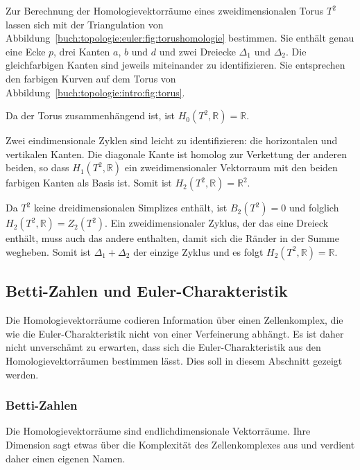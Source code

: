 \begin{beispiel}
\label{buch:topologie:euler:beispiel:torus}
Zur Berechnung der Homologievektorräume eines zweidimensionalen
Torus $T^2$ lassen sich mit der Triangulation von
Abbildung~\ref{buch:topologie:euler:fig:torushomologie} bestimmen.
Sie enthält genau eine Ecke $p$, drei Kanten $a$, $b$ und $d$ und
zwei Dreiecke $\Delta_1$ und $\Delta_2$.
Die gleichfarbigen Kanten sind jeweils miteinander zu identifizieren.
Sie entsprechen den farbigen Kurven auf dem Torus von
Abbildung~\ref{buch:topologie:intro:fig:torus}.

Da der Torus zusammenhängend ist, ist $H_0(T^2,\mathbb{R})=\mathbb{R}$.

Zwei eindimensionale Zyklen sind leicht zu identifizieren: die 
horizontalen und vertikalen Kanten.
Die diagonale Kante ist homolog zur Verkettung der anderen beiden,
so dass $H_1(T^2,\mathbb{R})$ ein zweidimensionaler Vektorraum
mit den beiden farbigen Kanten als Basis ist.
Somit ist $H_2(T^2,\mathbb{R})=\mathbb{R}^2$.

Da $T^2$ keine dreidimensionalen Simplizes enthält, ist $B_2(T^2)=0$
und folglich $H_2(T^2,\mathbb{R}) = Z_2(T^2)$.
Ein zweidimensionaler Zyklus, der das eine Dreieck enthält, muss auch
das andere enthalten, damit sich die Ränder in der Summe wegheben.
Somit ist $\Delta_1 + \Delta_2$ der einzige Zyklus und es folgt
$H_2(T^2,\mathbb{R})=\mathbb{R}$.
\end{beispiel}

%
%
\subsection{Betti-Zahlen und Euler-Charakteristik
\label{buch:topologie:simplex:subsection:betti-euler}}
Die Homologievektorräume codieren Information über einen Zellenkomplex,
die wie die Euler-Charakteristik nicht von einer Verfeinerung
abhängt.
Es ist daher nicht unverschämt zu erwarten, dass sich die Euler-Charakteristik
aus den Homologievektorräumen bestimmen lässt.
Dies soll in diesem Abschnitt gezeigt werden.

%
%
\subsubsection{Betti-Zahlen}
Die Homologievektorräume sind endlichdimensionale Vektorräume.
Ihre Dimension sagt etwas über die Komplexität des Zellenkomplexes
aus und verdient daher einen eigenen Namen.

